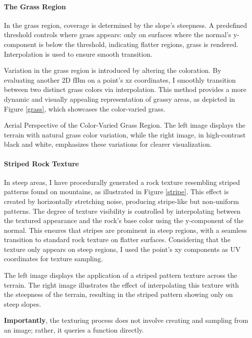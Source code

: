\paragraph{The Grass Region}
In the grass region, coverage is determined by the slope's steepness. A predefined threshold controls where grass appears: only on surfaces where the normal's y-component is below the threshold, indicating flatter regions, grass is rendered. Interpolation is used to ensure smooth transition. 

Variation in the grass region is introduced by altering the coloration. By evaluating another 2D fBm on a point's xz coordinates, I smoothly transition between two distinct grass colors via interpolation. This method provides a more dynamic and visually appealing representation of grassy areas, as depicted in Figure \ref{grass}, which showcases the color-varied grass.

{Aerial Perspective of the Color-Varied Grass Region. The left image displays the terrain with natural grass color variation, while the right image, in high-contrast black and white, emphasizes these variations for clearer visualization.}

\paragraph{Striped Rock Texture}
In steep areas, I have procedurally generated a rock texture resembling striped patterns found on mountains, as illustrated in Figure \ref{stripe}. This effect is created by horizontally stretching noise, producing stripe-like but non-uniform patterns. The degree of texture visibility is controlled by interpolating between the textured appearance and the rock's base color using the y-component of the normal. This ensures that stripes are prominent in steep regions, with a seamless transition to standard rock texture on flatter surfaces. Considering that the texture only appears on steep regions, I used the point's xy components as UV coordinates for texture sampling. 

{The left image displays the application of a striped pattern texture across the terrain. The right image illustrates the effect of interpolating this texture with the steepness of the terrain, resulting in the striped pattern showing only on steep slopes.}

\textbf{Importantly}, the texturing process does not involve creating and sampling from an image; rather, it queries a function directly.


